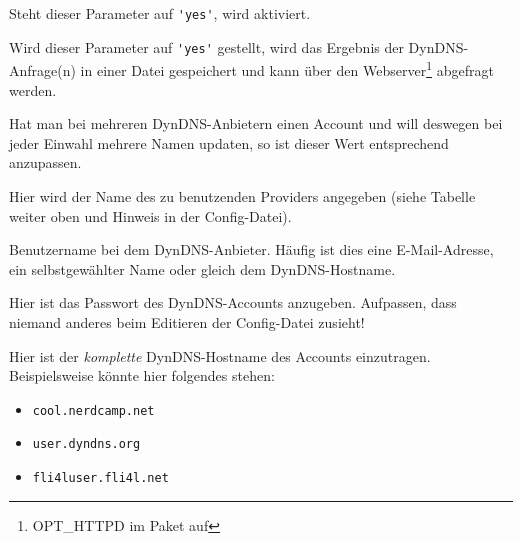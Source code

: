 \begin{description}


    {Steht dieser Parameter auf \verb*?'yes'?, wird  aktiviert.}


	{Wird dieser Parameter auf \verb*?'yes'? gestellt, wird das Ergebnis
	der DynDNS-Anfrage(n) in einer Datei gespeichert und kann über
	den Webserver\footnote{OPT\_HTTPD im Paket  auf
	} abgefragt werden.}


	{Hat man bei mehreren DynDNS-Anbietern einen Account und will deswegen
	bei jeder Einwahl mehrere Namen updaten, so ist dieser Wert
	entsprechend anzupassen.}


	{Hier wird der Name des zu benutzenden Providers angegeben (siehe
	Tabelle weiter oben und Hinweis in der Config-Datei).}


	{Benutzername bei dem DynDNS-Anbieter. Häufig ist dies eine
	E-Mail-Adresse, ein selbstgewählter Name oder gleich dem
	DynDNS-Hostname.}


	{Hier ist das Passwort des DynDNS-Accounts anzugeben. Aufpassen,
	dass niemand anderes beim Editieren der Config-Datei zusieht!}


	{Hier ist der \emph{komplette} DynDNS-Hostname des Accounts
	einzutragen. Beispielsweise könnte hier folgendes stehen:

	\begin{itemize}
		\item \texttt{cool.nerdcamp.net}
		\item \texttt{user.dyndns.org}
		\item \texttt{fli4luser.fli4l.net}
	\end{itemize}

	}



\end{description}
